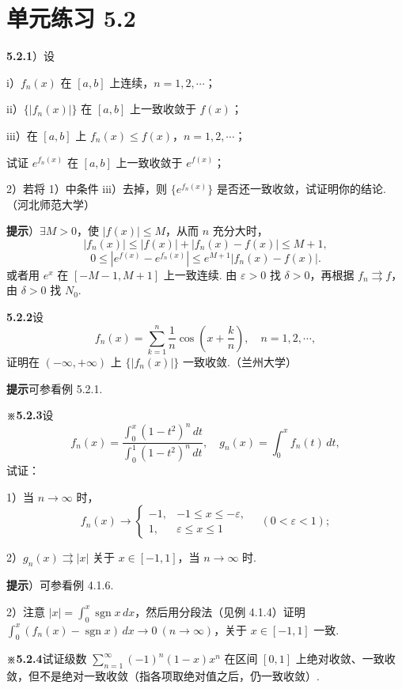\documentclass[UTF8, 12pt, fontset=fandol, oneside]{ctexart}
\begin{document}
\section*{单元练习 5.2}

\noindent\textbf{5.2.1}）设

i）$f_n(x)$ 在 $[a,b]$ 上连续，$n=1,2,\cdots$；

ii）$\{|f_n(x)|\}$ 在 $[a,b]$ 上一致收敛于 $f(x)$；

iii）在 $[a,b]$ 上 $f_n(x)\le f(x)$，$n=1,2,\cdots$；

试证 $e^{f_n(x)}$ 在 $[a,b]$ 上一致收敛于 $e^{f(x)}$；

2）若将 1）中条件 iii）去掉，则 $\{e^{f_n(x)}\}$ 是否还一致收敛，试证明你的结论.（河北师范大学）

\noindent\textbf{提示}）$\exists M>0$，使 $|f(x)|\le M$，从而 $n$ 充分大时，
\[
  |f_n(x)|\le |f(x)|+|f_n(x)-f(x)|\le M+1,
\]
\[
  0\le |e^{f(x)}-e^{f_n(x)}|\le e^{M+1}|f_n(x)-f(x)|.
\]
或者用 $e^x$ 在 $[-M-1,M+1]$ 上一致连续. 由 $\varepsilon>0$ 找 $\delta>0$，再根据
$f_n\rightrightarrows f$，由 $\delta>0$ 找 $N_0$.

\noindent\textbf{5.2.2}\quad 设
\[
  f_n(x)=\sum_{k=1}^n\frac1n\cos\left(x+\frac kn\right),\quad n=1,2,\cdots,
\]
证明在 $(-\infty,+\infty)$ 上 $\{|f_n(x)|\}$ 一致收敛.（兰州大学）

\noindent\textbf{提示}\quad 可参看例 5.2.1.

\noindent\textbf{※5.2.3}\quad 设
\[
  f_n(x)=\frac{\displaystyle\int_0^x(1-t^2)^n\,dt}{\displaystyle\int_0^1(1-t^2)^n\,dt},\quad
  g_n(x)=\int_0^x f_n(t)\,dt,
\]
试证：

1）当 $n\to\infty$ 时，
\[
  f_n(x)\to
  \begin{cases}
    -1,&-1\le x\le-\varepsilon,\\
    1,&\varepsilon\le x\le1
  \end{cases}
  \quad(0<\varepsilon<1);
\]

2）$g_n(x)\rightrightarrows |x|$ 关于 $x\in[-1,1]$，当 $n\to\infty$ 时.

\noindent\textbf{提示}）可参看例 4.1.6.

2）注意 $|x|=\displaystyle\int_0^x\operatorname{sgn}x\,dx$，然后用分段法（见例 4.1.4）证明
$\displaystyle\int_0^x(f_n(x)-\operatorname{sgn}x)\,dx\to0\ (n\to\infty)$，关于 $x\in[-1,1]$ 一致.

\noindent\textbf{※5.2.4}\quad 试证级数 $\displaystyle\sum_{n=1}^{\infty}(-1)^n(1-x)x^n$ 在区间 $[0,1]$ 上绝对收敛、一致收敛，但不是绝对一致收敛（指各项取绝对值之后，仍一致收敛）.
\end{document}
